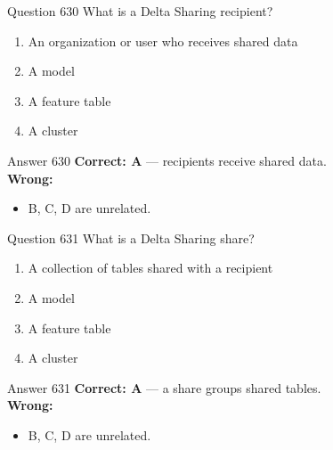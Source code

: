 \documentclass[aspectratio=169,11pt]{beamer}
\begin{document}
	\begin{frame}{Question 630}
		What is a Delta Sharing recipient?
		\begin{enumerate}[label=\Alph*.]
			\item An organization or user who receives shared data
			\item A model
			\item A feature table
			\item A cluster
		\end{enumerate}
	\end{frame}
	\begin{frame}{Answer 630}
		\textbf{Correct: A} --- recipients receive shared data.\\
		\vspace{0.5em}
		\textbf{Wrong:}
		\begin{itemize}
			\item B, C, D are unrelated.
		\end{itemize}
	\end{frame}
	
	\begin{frame}{Question 631}
		What is a Delta Sharing share?
		\begin{enumerate}[label=\Alph*.]
			\item A collection of tables shared with a recipient
			\item A model
			\item A feature table
			\item A cluster
		\end{enumerate}
	\end{frame}
	\begin{frame}{Answer 631}
		\textbf{Correct: A} --- a share groups shared tables.\\
		\vspace{0.5em}
		\textbf{Wrong:}
		\begin{itemize}
			\item B, C, D are unrelated.
		\end{itemize}
	\end{frame}
	
\end{document}
